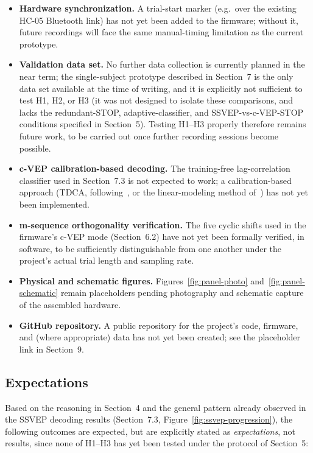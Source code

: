\documentclass[11pt]{article}
\begin{document}
\begin{itemize}
  \item \textbf{Hardware synchronization.} A trial-start marker (e.g.\ over the existing HC-05 Bluetooth link) has not yet been added to the firmware; without it, future recordings will face the same manual-timing limitation as the current prototype.
  \item \textbf{Validation data set.} No further data collection is currently planned in the near term; the single-subject prototype described in Section~7 is the only data set available at the time of writing, and it is explicitly not sufficient to test H1, H2, or H3 (it was not designed to isolate these comparisons, and lacks the redundant-STOP, adaptive-classifier, and SSVEP-vs-c-VEP-STOP conditions specified in Section~5). Testing H1--H3 properly therefore remains future work, to be carried out once further recording sessions become possible.
  \item \textbf{c-VEP calibration-based decoding.} The training-free lag-correlation classifier used in Section~7.3 is not expected to work; a calibration-based approach (TDCA, following~\cite{liu2021tdca}, or the linear-modeling method of~\cite{miao2024cvepminimal}) has not yet been implemented.
  \item \textbf{m-sequence orthogonality verification.} The five cyclic shifts used in the firmware's c-VEP mode (Section~6.2) have not yet been formally verified, in software, to be sufficiently distinguishable from one another under the project's actual trial length and sampling rate.
  \item \textbf{Physical and schematic figures.} Figures~\ref{fig:panel-photo} and~\ref{fig:panel-schematic} remain placeholders pending photography and schematic capture of the assembled hardware.
  \item \textbf{GitHub repository.} A public repository for the project's code, firmware, and (where appropriate) data has not yet been created; see the placeholder link in Section~9.
\end{itemize}

\subsection{Expectations}

Based on the reasoning in Section~4 and the general pattern already observed in the SSVEP decoding results (Section~7.3, Figure~\ref{fig:ssvep-progression}), the following outcomes are expected, but are explicitly stated as \emph{expectations}, not results, since none of H1--H3 has yet been tested under the protocol of Section~5:
\end{document}
